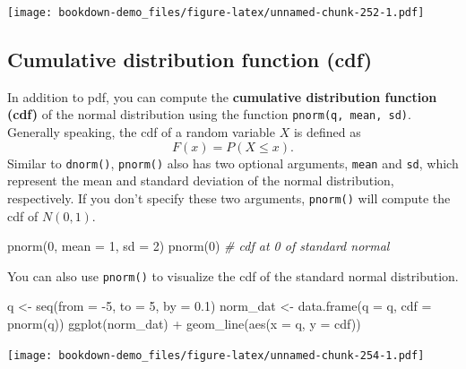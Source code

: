 \documentclass[
]{book}
\newenvironment{Shaded}{\begin{snugshade}}{\end{snugshade}}
\newcommand{\AttributeTok}[1]{\textcolor[rgb]{0.77,0.63,0.00}{#1}}
\newcommand{\CommentTok}[1]{\textcolor[rgb]{0.56,0.35,0.01}{\textit{#1}}}
\newcommand{\DecValTok}[1]{\textcolor[rgb]{0.00,0.00,0.81}{#1}}
\newcommand{\FloatTok}[1]{\textcolor[rgb]{0.00,0.00,0.81}{#1}}
\newcommand{\FunctionTok}[1]{\textcolor[rgb]{0.00,0.00,0.00}{#1}}
\newcommand{\NormalTok}[1]{#1}
\newcommand{\OtherTok}[1]{\textcolor[rgb]{0.56,0.35,0.01}{#1}}
\newcommand{\SpecialCharTok}[1]{\textcolor[rgb]{0.00,0.00,0.00}{#1}}
\begin{document}
\texttt{[image: bookdown-demo\_files/figure-latex/unnamed-chunk-252-1.pdf]}

\hypertarget{cdf}{%
\subsection{Cumulative distribution function (cdf)}\label{cdf}}

In addition to pdf, you can compute the \textbf{cumulative distribution function (cdf)} of the normal distribution using the function \texttt{pnorm(q,\ mean,\ sd)}. Generally speaking, the cdf of a random variable \(X\) is defined as
\[F(x) = P(X\leq x).\] Similar to \texttt{dnorm()}, \texttt{pnorm()} also has two optional arguments, \texttt{mean} and \texttt{sd}, which represent the mean and standard deviation of the normal distribution, respectively. If you don't specify these two arguments, \texttt{pnorm()} will compute the cdf of \(N(0,1)\).

\begin{Shaded}
\begin{Highlighting}[]
\FunctionTok{pnorm}\NormalTok{(}\DecValTok{0}\NormalTok{, }\AttributeTok{mean =} \DecValTok{1}\NormalTok{, }\AttributeTok{sd =} \DecValTok{2}\NormalTok{)}
\FunctionTok{pnorm}\NormalTok{(}\DecValTok{0}\NormalTok{) }\CommentTok{\# cdf at 0 of standard normal}
\end{Highlighting}
\end{Shaded}

You can also use \texttt{pnorm()} to visualize the cdf of the standard normal distribution.

\begin{Shaded}
\begin{Highlighting}[]
\NormalTok{q }\OtherTok{\textless{}{-}} \FunctionTok{seq}\NormalTok{(}\AttributeTok{from =} \SpecialCharTok{{-}}\DecValTok{5}\NormalTok{, }\AttributeTok{to =} \DecValTok{5}\NormalTok{, }\AttributeTok{by =} \FloatTok{0.1}\NormalTok{)}
\NormalTok{norm\_dat }\OtherTok{\textless{}{-}} \FunctionTok{data.frame}\NormalTok{(}\AttributeTok{q =}\NormalTok{ q, }\AttributeTok{cdf =} \FunctionTok{pnorm}\NormalTok{(q))}
\FunctionTok{ggplot}\NormalTok{(norm\_dat) }\SpecialCharTok{+} \FunctionTok{geom\_line}\NormalTok{(}\FunctionTok{aes}\NormalTok{(}\AttributeTok{x =}\NormalTok{ q, }\AttributeTok{y =}\NormalTok{ cdf))}
\end{Highlighting}
\end{Shaded}

\texttt{[image: bookdown-demo\_files/figure-latex/unnamed-chunk-254-1.pdf]}
\end{document}
